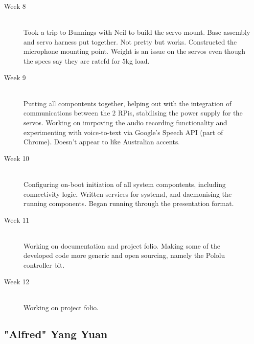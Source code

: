 \documentclass[11pt,a4paper,titlepage]{report}
\begin{document}
\begin{description}
  \item[Week 8] \hfill \\
    Took a trip to Bunnings with Neil to build the servo mount. Base assembly and servo harness put together. Not pretty but works. Constructed the microphone mounting point. Weight is an issue on the servos even though the specs say they are ratefd for 5kg load.
  \item[Week 9] \hfill \\
    Putting all compontents together, helping out with the integration of communications between the 2 RPis, stabilising the power supply for the servos.
     Working on imrpoving the audio recording functionality and experimenting with voice-to-text via Google's Speech API (part of Chrome). Doesn't appear to like Australian accents.
  \item[Week 10] \hfill \\
    Configuring on-boot initiation of all system compontents, including connectivity logic. Written services for systemd, and daemonising the running components.
    Began running through the presentation format.
 
  \item[Week 11] \hfill \\
    Working on documentation and project folio.
    Making some of the developed code more generic and open sourcing, namely the Pololu controller bit.
  \item[Week 12] \hfill \\
     Working on project folio.

\end{description}


\subsection{"Alfred" Yang Yuan}
\end{document}
